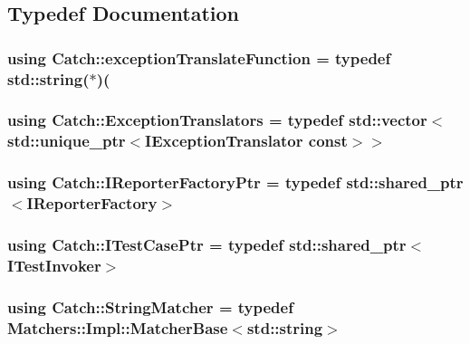 \subsection{Typedef Documentation}
\hypertarget{namespace_catch_ae1eb414b7cb69238d2be7c073e7be031}{
\subsubsection[{exception\-Translate\-Function}]{\setlength{\rightskip}{0pt plus 5cm}using Catch\-::exception\-Translate\-Function = typedef std\-::string($\ast$)(}}\label{namespace_catch_ae1eb414b7cb69238d2be7c073e7be031}
\hypertarget{namespace_catch_a86864e320fea8e13a9b27ac3894a9959}{
\subsubsection[{Exception\-Translators}]{\setlength{\rightskip}{0pt plus 5cm}using {\bf Catch\-::\-Exception\-Translators} = typedef std\-::vector$<$std\-::unique\-\_\-ptr$<${\bf I\-Exception\-Translator} const$>$$>$}}\label{namespace_catch_a86864e320fea8e13a9b27ac3894a9959}
\hypertarget{namespace_catch_ad1b36ac40c2739e52fd453dcdddf0d09}{
\subsubsection[{I\-Reporter\-Factory\-Ptr}]{\setlength{\rightskip}{0pt plus 5cm}using {\bf Catch\-::\-I\-Reporter\-Factory\-Ptr} = typedef std\-::shared\-\_\-ptr$<$I\-Reporter\-Factory$>$}}\label{namespace_catch_ad1b36ac40c2739e52fd453dcdddf0d09}
\hypertarget{namespace_catch_afa04ebe8e9423240c9585f7101a82ddf}{
\subsubsection[{I\-Test\-Case\-Ptr}]{\setlength{\rightskip}{0pt plus 5cm}using {\bf Catch\-::\-I\-Test\-Case\-Ptr} = typedef std\-::shared\-\_\-ptr$<${\bf I\-Test\-Invoker}$>$}}\label{namespace_catch_afa04ebe8e9423240c9585f7101a82ddf}
\hypertarget{namespace_catch_aba438977e831821a2eeca82b9b4f4af2}{
\subsubsection[{String\-Matcher}]{\setlength{\rightskip}{0pt plus 5cm}using {\bf Catch\-::\-String\-Matcher} = typedef {\bf Matchers\-::\-Impl\-::\-Matcher\-Base}$<$std\-::string$>$}}\label{namespace_catch_aba438977e831821a2eeca82b9b4f4af2}


